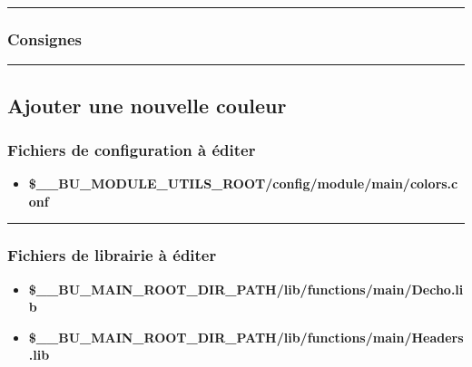 \documentclass[a4paper,10pt]{article}
\begin{document}

\color{blue}\par\noindent\rule{\textwidth}{0.4pt}\color{white}

\color{blue}
\subsubsection{Consignes}\color{white}




\color{green}\par\noindent\rule{\textwidth}{0.4pt}\color{white}

\color{green}
\subsection{Ajouter une nouvelle couleur}\color{white}

\color{blue}
\subsubsection{Fichiers de configuration à éditer}\color{white}

\begin{itemize}
    \item \textbf{\color{orange}\$\_\_BU\_MODULE\_UTILS\_ROOT\color{lime}/config/module/main/colors.conf}\\[1\baselineskip]
\end{itemize}



\color{blue}\par\noindent\rule{\textwidth}{0.4pt}\color{white}

\color{blue}
\subsubsection{Fichiers de librairie à éditer}\color{white}

\begin{itemize}
    \item \textbf{\color{orange}\$\_\_BU\_MAIN\_ROOT\_DIR\_PATH\color{lime}/lib/functions/main/Decho.lib}
    \item \textbf{\color{orange}\$\_\_BU\_MAIN\_ROOT\_DIR\_PATH\color{lime}/lib/functions/main/Headers.lib}\\[1\baselineskip]
\end{itemize}
\end{document}
